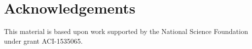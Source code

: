 \documentclass[12pt]{ussci}
\begin{document}
\section{Acknowledgements}
This material is based upon work supported by the National Science Foundation under grant ACI-1535065.

\setlength{\emergencystretch}{3em}
\printbibliography
\end{document}
